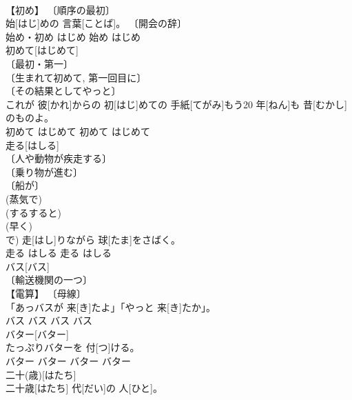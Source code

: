 \documentclass[8pt]{extreport}
\begin{document}
\begin{CJK}{UTF8}{min}
\\	【初め】 〔順序の最初〕 
\\	始[はじ]めの 言葉[ことば]。	〔開会の辞〕 
\\	始め・初め	はじめ	始め	はじめ	
\\	初めて[はじめて]	
\\	〔最初・第一〕 
\\	〔生まれて初めて, 第一回目に〕 
\\	〔その結果としてやっと〕 
\\	これが 彼[かれ]からの 初[はじ]めての 手紙[てがみ]もう20 年[ねん]も 昔[むかし]のものよ。	
\\	初めて	はじめて	初めて	はじめて	
\\	走る[はしる]	
\\	〔人や動物が疾走する〕 
\\	〔乗り物が進む〕 
\\	〔船が〕 
\\	(蒸気で) 
\\	(するすると) 
\\	(早く) 
\\	[⇒はしらせる 
\\	【電算】 〔プログラムが動作する〕 
\\	〔急行する〕 
\\	〔ものごとを実行する; どんどん進める; 先走る〕 ⇒はしりすぎる 
\\	〔好ましくない方向に傾く〕 
\\	〔出奔する. 逃亡する〕 
\\	〔敗走する〕 
\\	〔一瞬現れる〕 
\\	〔なめらかに動く〕 
\\	〔道などが伸びる〕 
\\	野球[やきゅう]で) 走[はし]りながら 球[たま]をさばく。	
\\	走る	はしる	走る	はしる	
\\	バス[バス]	
\\	〔輸送機関の一つ〕 
\\	【電算】 〔母線〕 
\\	「あっバスが 来[き]たよ」「やっと 来[き]たか」。	
\\	バス	バス	バス	バス	
\\	バター[バター]	
\\	たっぷりバターを 付[つ]ける。	
\\	バター	バター	バター	バター	
\\	二十(歳)[はたち]	
\\	二十歳[はたち] 代[だい]の 人[ひと]。	

\end{CJK}
\end{document}

